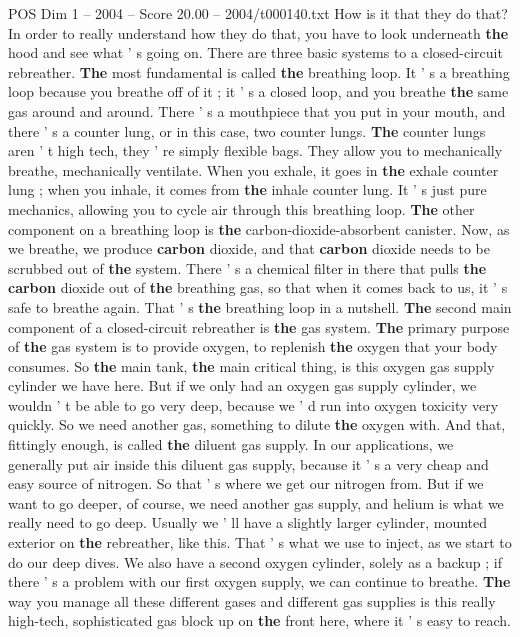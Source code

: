 \begin{textsample}{POS Dim 1 – 2004 – Score 20.00 – 2004/t000140.txt}
How is it that they do that?
In order to really understand how they do that, you have to look underneath \textbf{the} hood and see what ' s going on.
There are three basic systems to a closed-circuit rebreather. \textbf{The} most fundamental is called \textbf{the} breathing loop.
It ' s a breathing loop because you breathe off of it ; it ' s a closed loop, and you breathe \textbf{the} same gas around and around.
There ' s a mouthpiece that you put in your mouth, and there ' s a counter lung, or in this case, two counter lungs. \textbf{The} counter lungs aren ' t high tech, they ' re simply flexible bags.
They allow you to mechanically breathe, mechanically ventilate.
When you exhale, it goes in \textbf{the} exhale counter lung ; when you inhale, it comes from \textbf{the} inhale counter lung.
It ' s just pure mechanics, allowing you to cycle air through this breathing loop. \textbf{The} other component on a breathing loop is \textbf{the} carbon-dioxide-absorbent canister.
Now, as we breathe, we produce \textbf{carbon} dioxide, and that \textbf{carbon} dioxide needs to be scrubbed out of \textbf{the} system.
There ' s a chemical filter in there that pulls \textbf{the} \textbf{carbon} dioxide out of \textbf{the} breathing gas, so that when it comes back to us, it ' s safe to breathe again.
That ' s \textbf{the} breathing loop in a nutshell. \textbf{The} second main component of a closed-circuit rebreather is \textbf{the} gas system. \textbf{The} primary purpose of \textbf{the} gas system is to provide oxygen, to replenish \textbf{the} oxygen that your body consumes.
So \textbf{the} main tank, \textbf{the} main critical thing, is this oxygen gas supply cylinder we have here.
But if we only had an oxygen gas supply cylinder, we wouldn ' t be able to go very deep, because we ' d run into oxygen toxicity very quickly.
So we need another gas, something to dilute \textbf{the} oxygen with.
And that, fittingly enough, is called \textbf{the} diluent gas supply.
In our applications, we generally put air inside this diluent gas supply, because it ' s a very cheap and easy source of nitrogen.
So that ' s where we get our nitrogen from.
But if we want to go deeper, of course, we need another gas supply, and helium is what we really need to go deep.
Usually we ' ll have a slightly larger cylinder, mounted exterior on \textbf{the} rebreather, like this.
That ' s what we use to inject, as we start to do our deep dives.
We also have a second oxygen cylinder, solely as a backup ; if there ' s a problem with our first oxygen supply, we can continue to breathe. \textbf{The} way you manage all these different gases and different gas supplies is this really high-tech, sophisticated gas block up on \textbf{the} front here, where it ' s easy to reach.

\end{textsample}

